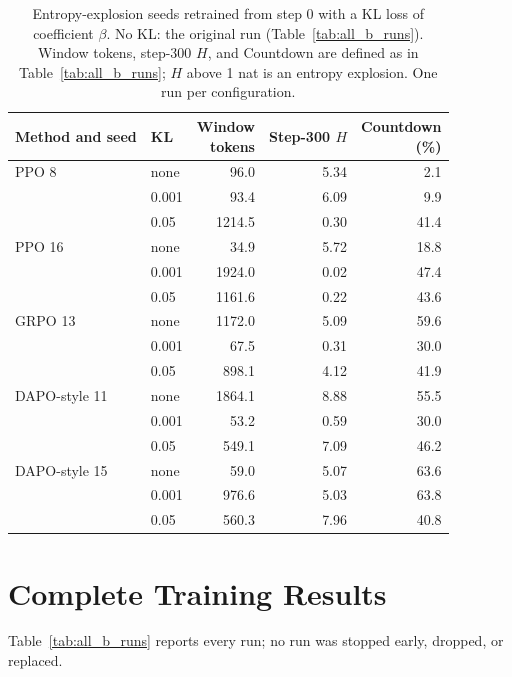 \documentclass[ai,article,submit,oneauthor]{Definitions/mdpi}
\begin{document}
\begin{table}[H]
\centering
\scriptsize
\caption{Entropy-explosion seeds retrained from step 0 with a KL loss of coefficient $\beta$. No KL: the original run (Table~\ref{tab:all_b_runs}). Window tokens, step-300 $H$, and Countdown are defined as in Table~\ref{tab:all_b_runs}; $H$ above 1 nat is an entropy explosion. One run per configuration.}
\label{tab:kl_from_start}
\begin{tabular}{llrrr}
\toprule
Method and seed & KL & \shortstack{Window\\tokens} & \shortstack{Step-300\\$H$} & \shortstack{Countdown\\(\%)} \\
\midrule
PPO 8 & none & 96.0 & 5.34 & 2.1 \\
 & 0.001 & 93.4 & 6.09 & 9.9 \\
 & 0.05 & 1214.5 & 0.30 & 41.4 \\
\midrule
PPO 16 & none & 34.9 & 5.72 & 18.8 \\
 & 0.001 & 1924.0 & 0.02 & 47.4 \\
 & 0.05 & 1161.6 & 0.22 & 43.6 \\
\midrule
GRPO 13 & none & 1172.0 & 5.09 & 59.6 \\
 & 0.001 & 67.5 & 0.31 & 30.0 \\
 & 0.05 & 898.1 & 4.12 & 41.9 \\
\midrule
DAPO-style 11 & none & 1864.1 & 8.88 & 55.5 \\
 & 0.001 & 53.2 & 0.59 & 30.0 \\
 & 0.05 & 549.1 & 7.09 & 46.2 \\
\midrule
DAPO-style 15 & none & 59.0 & 5.07 & 63.6 \\
 & 0.001 & 976.6 & 5.03 & 63.8 \\
 & 0.05 & 560.3 & 7.96 & 40.8 \\
\bottomrule
\end{tabular}
\end{table}

\section{Complete Training Results}\label{app:complete_results}

Table~\ref{tab:all_b_runs} reports every run; no run was stopped early, dropped, or replaced.
\end{document}
